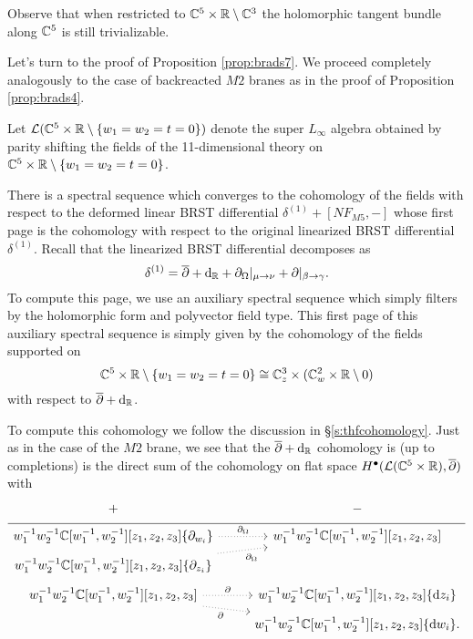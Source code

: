 Observe that when restricted to $\mathbb C^5 \times \mathbb R \setminus \mathbb C^3$ the holomorphic tangent bundle along $\mathbb C^5$ is still trivializable. 

\parsec[]

Let's turn to the proof of Proposition \ref{prop:brads7}.
We proceed completely analogously to the case of backreacted $M2$ branes as in the proof of Proposition \ref{prop:brads4}. 

Let $\mathcal L (\mathbb C^5 \times \mathbb R \setminus \{w_1=w_2=t=0\})$ denote the super $L_\infty$ algebra obtained by parity shifting the fields of the 11-dimensional theory on $\mathbb C^5 \times \mathbb R \setminus \{w_1=w_2=t=0\}$. 

There is a spectral sequence which converges to the cohomology of the fields with respect to the deformed linear BRST differential $\delta^{(1)} + [N F_{M5},-]$ whose first page
is the cohomology with respect to the original linearized BRST differential $\delta^{(1)}$. 
Recall that the linearized BRST differential decomposes as
\[
\delta^{(1)} = \overline{\partial} + {\rm d}_{\mathbb R} + \partial_{\Omega} |_{\mu \to \nu} + \partial |_{\beta \to \gamma}  .
\]
To compute this page, we use an auxiliary spectral sequence which simply filters by the holomorphic form and polyvector field type. 
This first page of this auxiliary spectral sequence is simply given by the cohomology of the fields supported on 
\[
\mathbb C^5 \times \mathbb R \setminus \{w_1=w_2=t=0\} \cong \mathbb C_z^3 \times (\mathbb C^2_w \times \mathbb R \setminus 0)
\]
with respect to $\overline{\partial} + {\rm d}_{\mathbb R}$. 

To compute this cohomology we follow the discussion in \S \ref{s:thfcohomology}.
Just as in the case of the $M2$ brane, we see that the $\overline{\partial} + {\rm d}_{\mathbb R}$ cohomology is (up to completions) is the direct sum of the cohomology on flat space $H^\bullet(\mathcal L(\mathbb C^5 \times \mathbb R), \overline{\partial})$ with
\begin{equation}
  \label{eqn:ads7ss2} 
  \begin{tikzcd}[row sep = 1 ex]
    + & - \\ \hline
w_1^{-1} w_2^{-1} \CC[w_1^{-1}, w_2^{-1}][z_1,z_2,z_3] \{\partial_{w_i}\}  \ar[r, dotted, "\div"] & w_1^{-1} w_2^{-1} \CC[w_1^{-1}, w_2^{-1}] [z_1,z_2,z_3] \\
w_1^{-1} w_2^{-1} \CC[w_1^{-1}, w_2^{-1}] [z_1,z_2,z_3] \{\del_{z_i}\} \ar[ur, dotted, "\div"'] \\
w_1^{-1} w_2^{-1} \CC[w_1^{-1}, w_2^{-1}] [z_1,z_2,z_3] \ar[r, dotted, "\del"] \ar[dr, dotted, "\del"'] & w_1^{-1} w_2^{-1} \CC[w_1^{-1}, w_2^{-1}][z_1,z_2,z_3] \{\d z_i\} \\ & w_1^{-1} w_2^{-1} \CC[w_1^{-1}, w_2^{-1}][z_1,z_2,z_3] \{\d w_i\} .
\end{tikzcd}
\end{equation}

